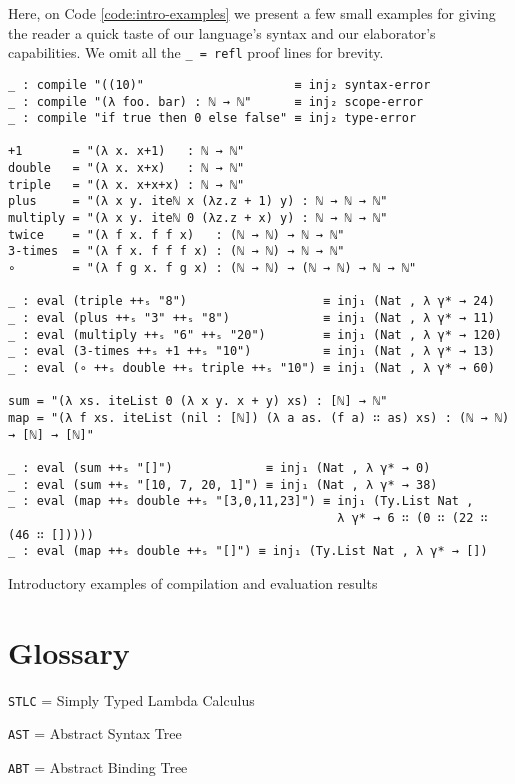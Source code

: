 Here, on Code \ref{code:intro-examples} we present a few small examples for giving the reader a quick taste of our language's syntax and our elaborator's capabilities. We omit all the \verb$_ = refl$ proof lines for brevity.

\begin{listing}[H]
\begin{verbatim}
_ : compile "((10)"                     ≡ inj₂ syntax-error
_ : compile "(λ foo. bar) : ℕ → ℕ"      ≡ inj₂ scope-error
_ : compile "if true then 0 else false" ≡ inj₂ type-error

+1       = "(λ x. x+1)   : ℕ → ℕ"
double   = "(λ x. x+x)   : ℕ → ℕ"
triple   = "(λ x. x+x+x) : ℕ → ℕ"
plus     = "(λ x y. iteℕ x (λz.z + 1) y) : ℕ → ℕ → ℕ"
multiply = "(λ x y. iteℕ 0 (λz.z + x) y) : ℕ → ℕ → ℕ"
twice    = "(λ f x. f f x)   : (ℕ → ℕ) → ℕ → ℕ"
3-times  = "(λ f x. f f f x) : (ℕ → ℕ) → ℕ → ℕ"
∘        = "(λ f g x. f g x) : (ℕ → ℕ) → (ℕ → ℕ) → ℕ → ℕ"

_ : eval (triple ++ₛ "8")                   ≡ inj₁ (Nat , λ γ* → 24)
_ : eval (plus ++ₛ "3" ++ₛ "8")             ≡ inj₁ (Nat , λ γ* → 11)
_ : eval (multiply ++ₛ "6" ++ₛ "20")        ≡ inj₁ (Nat , λ γ* → 120)
_ : eval (3-times ++ₛ +1 ++ₛ "10")          ≡ inj₁ (Nat , λ γ* → 13)
_ : eval (∘ ++ₛ double ++ₛ triple ++ₛ "10") ≡ inj₁ (Nat , λ γ* → 60)

sum = "(λ xs. iteList 0 (λ x y. x + y) xs) : [ℕ] → ℕ"
map = "(λ f xs. iteList (nil : [ℕ]) (λ a as. (f a) ∷ as) xs) : (ℕ → ℕ) → [ℕ] → [ℕ]"

_ : eval (sum ++ₛ "[]")             ≡ inj₁ (Nat , λ γ* → 0)
_ : eval (sum ++ₛ "[10, 7, 20, 1]") ≡ inj₁ (Nat , λ γ* → 38)
_ : eval (map ++ₛ double ++ₛ "[3,0,11,23]") ≡ inj₁ (Ty.List Nat ,
                                              λ γ* → 6 ∷ (0 ∷ (22 ∷ (46 ∷ []))))
_ : eval (map ++ₛ double ++ₛ "[]") ≡ inj₁ (Ty.List Nat , λ γ* → [])
\end{verbatim}
\caption{Introductory examples of compilation and evaluation results}
\label{code:intro-examples}
\end{listing}

\section{Glossary}

\verb$STLC$ = Simply Typed Lambda Calculus

\verb$AST$ = Abstract Syntax Tree

\verb$ABT$ = Abstract Binding Tree

